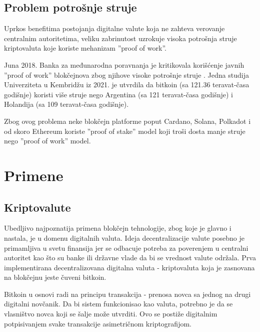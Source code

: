 \documentclass[a4paper]{article}
\begin{document}
\subsection{Problem potrošnje struje}
Uprkos benefitima postojanja digitalne valute koja ne zahteva verovanje centralnim autoritetima, veliku zabrinutost uzrokuje visoka potrošnja struje kriptovaluta koje koriste mehanizam ''proof of work''.

Juna 2018. Banka za međunarodna poravnanja je kritikovala korišćenje javnih ''proof of work'' blokčejnova zbog njihove visoke potrošnje struje \cite{shin2018chapterVcryptocurrencies}. 
Jedna studija Univerziteta u Kembridžu iz 2021. je utvrdila da bitkoin (sa 121.36 teravat-časa godišnje) koristi više struje nego Argentina (sa 121 teravat-časa godišnje) i Holandija (sa 109 teravat-časa godišnje). \cite{criddle2021bitcoin-electricity}

Zbog ovog problema neke blokčejn platforme poput Cardano, Solana, Polkadot i od skoro Ethereum koriste ''proof of stake'' model koji troši dosta manje struje nego ''proof of work'' model.

\section{Primene}
\label{sec:primene}

\subsection{Kriptovalute}
Ubedljivo najpoznatija primena blokčejn tehnologije, zbog koje je glavno i nastala, je u domenu digitalnih valuta.
Ideja decentralizacije valute posebno je primamljiva u svetu finansija jer se odbacuje potreba za poverenjem
u centralni autoritet kao što su banke ili državne vlade da bi se vrednost valute održala. 
Prva implementirana decentralizovana digitalna valuta - kriptovaluta koja je zasnovana na blokčejnu jeste čuveni bitkoin.

Bitkoin u osnovi radi na principu transakcija - prenosa novca sa jednog na drugi digitalni novčanik. Da bi sistem funkcionisao
kao valuta, potrebno je da se vlasništvo novca koji se šalje može utvrditi. Ovo se postiže digitalnim potpisivanjem svake transakcije
asimetričnom kriptografijom.
\end{document}
